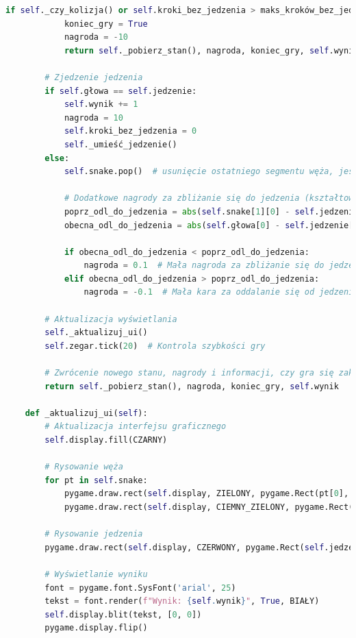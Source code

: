 \documentclass[a4paper,12pt]{article}
\begin{document}
\begin{lstlisting}[language=Python]
        if self._czy_kolizja() or self.kroki_bez_jedzenia > maks_kroków_bez_jedzenia:
            koniec_gry = True
            nagroda = -10
            return self._pobierz_stan(), nagroda, koniec_gry, self.wynik
            
        # Zjedzenie jedzenia
        if self.głowa == self.jedzenie:
            self.wynik += 1
            nagroda = 10
            self.kroki_bez_jedzenia = 0
            self._umieść_jedzenie()
        else:
            self.snake.pop()  # usunięcie ostatniego segmentu węża, jeśli nie zjadł jedzenia
            
            # Dodatkowe nagrody za zbliżanie się do jedzenia (kształtowanie nagrody)
            poprz_odl_do_jedzenia = abs(self.snake[1][0] - self.jedzenie[0]) + abs(self.snake[1][1] - self.jedzenie[1])
            obecna_odl_do_jedzenia = abs(self.głowa[0] - self.jedzenie[0]) + abs(self.głowa[1] - self.jedzenie[1])
            
            if obecna_odl_do_jedzenia < poprz_odl_do_jedzenia:
                nagroda = 0.1  # Mała nagroda za zbliżanie się do jedzenia
            elif obecna_odl_do_jedzenia > poprz_odl_do_jedzenia:
                nagroda = -0.1  # Mała kara za oddalanie się od jedzenia
        
        # Aktualizacja wyświetlania
        self._aktualizuj_ui()
        self.zegar.tick(20)  # Kontrola szybkości gry
        
        # Zwrócenie nowego stanu, nagrody i informacji, czy gra się zakończyła
        return self._pobierz_stan(), nagroda, koniec_gry, self.wynik
    
    def _aktualizuj_ui(self):
        # Aktualizacja interfejsu graficznego
        self.display.fill(CZARNY)
        
        # Rysowanie węża
        for pt in self.snake:
            pygame.draw.rect(self.display, ZIELONY, pygame.Rect(pt[0], pt[1], self.rozmiar_bloku, self.rozmiar_bloku))
            pygame.draw.rect(self.display, CIEMNY_ZIELONY, pygame.Rect(pt[0] + 4, pt[1] + 4, self.rozmiar_bloku - 8, self.rozmiar_bloku - 8))
            
        # Rysowanie jedzenia
        pygame.draw.rect(self.display, CZERWONY, pygame.Rect(self.jedzenie[0], self.jedzenie[1], self.rozmiar_bloku, self.rozmiar_bloku))
        
        # Wyświetlanie wyniku
        font = pygame.font.SysFont('arial', 25)
        tekst = font.render(f"Wynik: {self.wynik}", True, BIAŁY)
        self.display.blit(tekst, [0, 0])
        pygame.display.flip()



\end{lstlisting}
\end{document}

